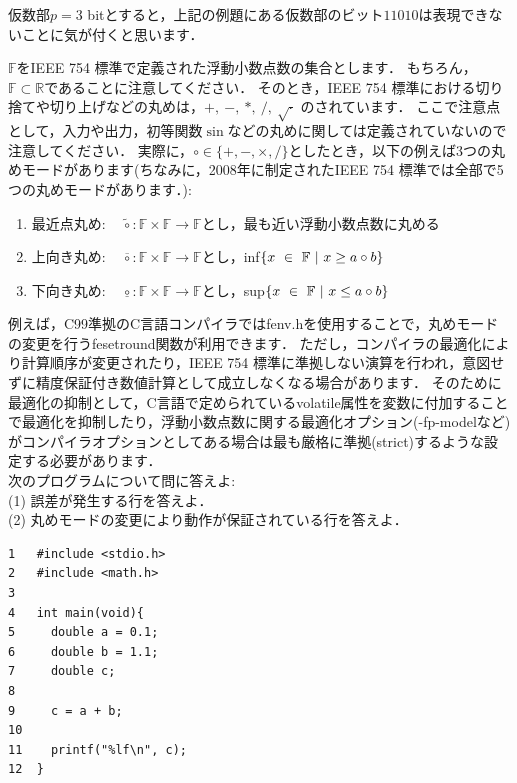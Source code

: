 仮数部$p = 3$ bitとすると，上記の例題にある仮数部のビット$11010$は表現できないことに気が付くと思います．

${\mathbb{F}}$をIEEE 754 標準で定義された浮動小数点数の集合とします．
もちろん，${\mathbb{F}} \subset {\mathbb{R}}$であることに注意してください．
そのとき，IEEE 754 標準における切り捨てや切り上げなどの丸めは，$+ , ~ -, ~ *, ~  /, ~ \sqrt{\cdot} $ のされています．
ここで注意点として，入力や出力，初等関数$\sin$などの丸めに関しては定義されていないので注意してください．
実際に，$\circ \in \{ +, -, \times, /  \}$としたとき，以下の例えば3つの丸めモードがあります(ちなみに，2008年に制定されたIEEE 754 標準では全部で5つの丸めモードがあります．):

\begin{enumerate}[label=\alph*), leftmargin=8mm, topsep=2pt, itemsep=0pt, parsep=0pt]
\item 最近点丸め: ~ $\tilde{\circ} : {\mathbb F} \times {\mathbb F} \rightarrow {\mathbb F}$とし，最も近い浮動小数点数に丸める
\item 上向き丸め: ~ $\overline{\circ} : {\mathbb F} \times {\mathbb F} \rightarrow {\mathbb F}$とし，inf$\{x\ \in \ \mathbb{F}\ |\ x \geq a \circ b \}$
\item 下向き丸め: ~ $\underline{\circ} : {\mathbb F} \times {\mathbb F} \rightarrow {\mathbb F}$とし，sup$\{x\ \in \ \mathbb{F}\ |\ x \leq a \circ b\}$
\end{enumerate}

例えば，C99準拠のC言語コンパイラではfenv.hを使用することで，丸めモードの変更を行うfesetround関数が利用できます．
ただし，コンパイラの最適化により計算順序が変更されたり，IEEE 754 標準に準拠しない演算を行われ，意図せずに精度保証付き数値計算として成立しなくなる場合があります．
そのために最適化の抑制として，C言語で定められているvolatile属性を変数に付加することで最適化を抑制したり，浮動小数点数に関する最適化オプション(-fp-modelなど)がコンパイラオプションとしてある場合は最も厳格に準拠(strict)するような設定する必要があります．\\


\Mondai
次のプログラムについて問に答えよ:\\
(1) 誤差が発生する行を答えよ．\\
(2) 丸めモードの変更により動作が保証されている行を答えよ．

\begin{verbatim}
1   #include <stdio.h>
2   #include <math.h>
3	
4   int main(void){
5     double a = 0.1;
6     double b = 1.1;
7     double c;
8
9     c = a + b;
10  
11    printf("%lf\n", c);
12  }
\end{verbatim}

